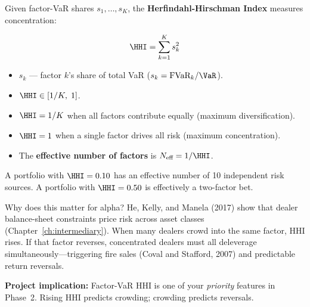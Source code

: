 Given factor-VaR shares $s_1, \ldots, s_K$, the
\textbf{Herfindahl-Hirschman Index} measures concentration:

\begin{definition}
\begin{equation}
\label{eq:hhi}
\HHI = \sum_{k=1}^K s_k^2
\end{equation}
\begin{itemize}[nosep]
  \item $s_k$ --- factor $k$'s share of total VaR
        ($s_k = \text{FVaR}_k / \VaR$).
  \item $\HHI \in [1/K,\; 1]$.
  \item $\HHI = 1/K$ when all factors contribute equally
        (maximum diversification).
  \item $\HHI = 1$ when a single factor drives all risk
        (maximum concentration).
  \item The \textbf{effective number of factors} is $N_{\text{eff}} = 1/\HHI$.
\end{itemize}
\end{definition}

\begin{keyidea}[Low HHI = Diversified; High HHI = Hidden Crowding]
A portfolio with $\HHI = 0.10$ has an effective number of 10 independent
risk sources.  A portfolio with $\HHI = 0.50$ is effectively a two-factor
bet.

Why does this matter for alpha?  He, Kelly, and Manela (2017) show that
dealer balance-sheet constraints price risk across asset classes
(Chapter~\ref{ch:intermediary}).  When many dealers crowd into the same
factor, HHI rises.  If that factor reverses, concentrated dealers must
all deleverage simultaneously---triggering fire sales
(Coval and Stafford, 2007) and predictable return reversals.

\textbf{Project implication:} Factor-VaR HHI is one of your
\emph{priority} features in Phase~2.  Rising HHI predicts crowding;
crowding predicts reversals.
\end{keyidea}

